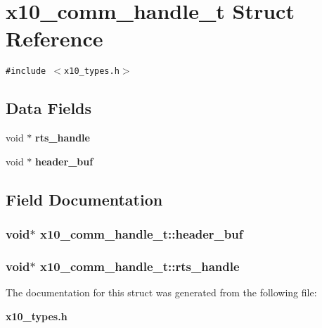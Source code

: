 \section{x10\_\-comm\_\-handle\_\-t Struct Reference}
\label{structx10__comm__handle__t}
{\tt \#include $<$x10\_\-types.h$>$}

\subsection*{Data Fields}
\begin{CompactItemize}
\item 
void $\ast$ {\bf rts\_\-handle}
\item 
void $\ast$ {\bf header\_\-buf}
\end{CompactItemize}


\subsection{Field Documentation}
\subsubsection{\setlength{\rightskip}{0pt plus 5cm}void$\ast$ {\bf x10\_\-comm\_\-handle\_\-t::header\_\-buf}}\label{structx10__comm__handle__t_o1}


\subsubsection{\setlength{\rightskip}{0pt plus 5cm}void$\ast$ {\bf x10\_\-comm\_\-handle\_\-t::rts\_\-handle}}\label{structx10__comm__handle__t_o0}




The documentation for this struct was generated from the following file:\begin{CompactItemize}
\item 
{\bf x10\_\-types.h}\end{CompactItemize}
